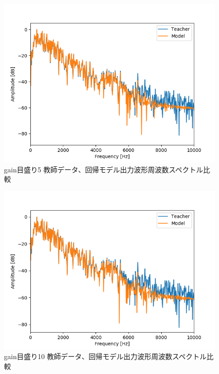 \documentclass{jreport}		%
\begin{document}
\begin{figure}[htbp]
 \begin{center}
  \includegraphics[width=150mm]{gain5_fft_hikaku.png}
 \end{center}
 \caption{gain目盛り5 教師データ、回帰モデル出力波形周波数スペクトル比較}
 \label{fig:one}
\end{figure}

\begin{figure}[htbp]
 \begin{center}
  \includegraphics[width=150mm]{gain10_fft_hikaku.png}
 \end{center}
 \caption{gain目盛り10 教師データ、回帰モデル出力波形周波数スペクトル比較}
 \label{fig:one}
\end{figure}
\end{document}
